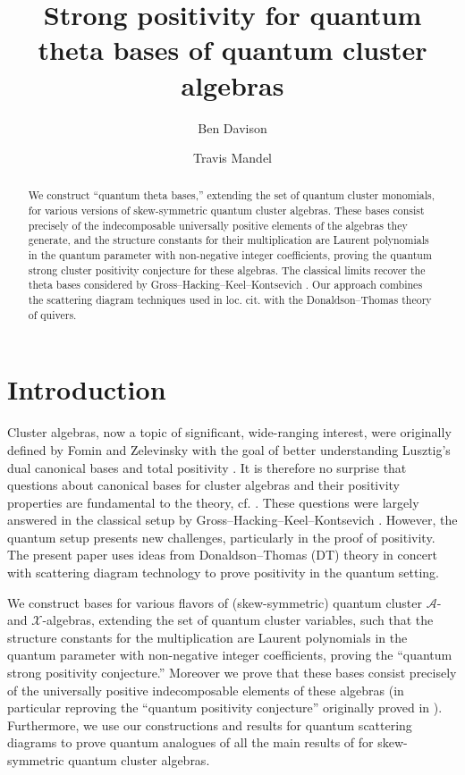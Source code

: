 \documentclass{amsart}
\title{Strong positivity for quantum theta bases of quantum cluster algebras}
\author{Ben Davison}
\author{Travis Mandel}
\let\s=\mathcal
\theoremstyle{plain}%
\theoremstyle{definition}
\theoremstyle{remark}
\begin{document}
\begin{abstract}
We construct ``quantum theta bases,'' extending the set of quantum cluster monomials, for various versions of skew-symmetric quantum cluster algebras.  These bases consist precisely of the indecomposable universally positive elements of the algebras they generate, and the structure constants for their multiplication are Laurent polynomials in the quantum parameter with non-negative integer coefficients, proving the quantum strong cluster positivity conjecture for these algebras.  The classical limits recover the theta bases considered by Gross--Hacking--Keel--Kontsevich \cite{GHKK}.  Our approach combines the scattering diagram techniques used in loc. cit. with the Donaldson--Thomas theory of quivers.
\end{abstract}


\maketitle

\setcounter{tocdepth}{1}
\tableofcontents  


\section{Introduction}\label{intro}

Cluster algebras, now a topic of significant, wide-ranging interest, were originally defined by Fomin and Zelevinsky \cite{FZ} with the goal of better understanding Lusztig's dual canonical bases \cite{LusDualCan} and total positivity \cite{LusTP}. It is therefore no surprise that questions about canonical bases for cluster algebras and their positivity properties are fundamental to the theory, cf. \cite[\S 4]{FG1}.  These questions were largely answered in the classical setup by Gross--Hacking--Keel--Kontsevich \cite{GHKK}.  However, the quantum setup presents new challenges, particularly in the proof of positivity.  The present paper uses ideas from Donaldson--Thomas (DT) theory \cite{KSmotivic,Keller,Nagao,DavMei,Bridge,MeiRei} in concert with scattering diagram technology \cite{KS,GrP2,GS11,CPS,FS,WCS,GHK1,GHKK,Man3} to prove positivity in the quantum setting.





We construct bases for various flavors of (skew-symmetric) quantum cluster $\s{A}$- and $\s{X}$-algebras, extending the set of quantum cluster variables, such that the structure constants for the multiplication are Laurent polynomials in the quantum parameter with non-negative integer coefficients, proving the ``quantum strong positivity conjecture.''  Moreover we prove that these bases consist precisely of the universally positive indecomposable elements of these algebras (in particular reproving the ``quantum positivity conjecture'' originally proved in \cite{DavPos}).  Furthermore, we use our constructions and results for quantum scattering diagrams to prove quantum analogues of all the main results of \cite{GHKK} for skew-symmetric quantum cluster algebras.
\end{document}
